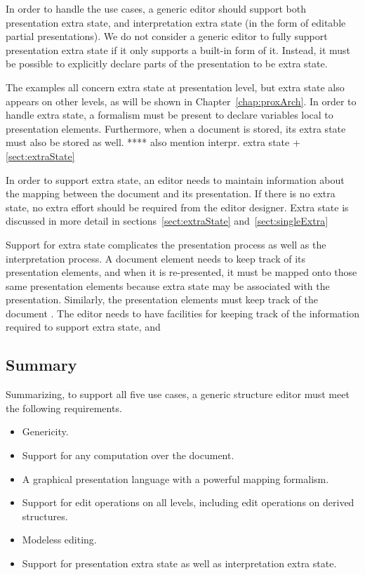 In order to handle the use cases, a generic editor should support both presentation extra state, and interpretation extra state (in the form of editable partial presentations). We do not consider a generic editor to fully support presentation extra state if it only supports a built-in form of it. Instead, it must be possible to explicitly declare parts of the presentation to be extra state.

\bc
The examples all concern extra state at presentation level, but extra state also appears on other levels, as will be shown in Chapter~\ref{chap:proxArch}. In order to handle extra state, a formalism must be present to declare variables local to presentation elements. Furthermore, when a document is stored, its extra state must also be stored as well. **** also mention interpr. extra state + \ref{sect:extraState}
\ec

In order to support extra state, an editor needs to maintain information about the mapping between the document and its presentation. If there is no extra state, no extra effort should be required from the editor designer. Extra state is discussed in more detail in sections~\ref{sect:extraState} and~\ref{sect:singleExtra}

\bc
Support for extra state complicates the presentation process as well as the interpretation process. A document element needs to keep track of its presentation elements, and when it is re-presented, it must be mapped onto those same presentation elements because extra state may be associated with the presentation. Similarly, the presentation elements must keep track of the document . The editor needs to have facilities for keeping track of the information required to support extra state, and
\ec


%																
\subsection{Summary}

Summarizing, to support all five use cases, a generic structure editor must meet the following requirements.

\begin{itemize}
\item Genericity.
\item Support for any computation over the document.
\item A graphical presentation language with a powerful mapping formalism.
\item Support for edit operations on all levels, including edit operations on derived structures.
\item Modeless editing.
\item Support for presentation extra state as well as interpretation extra state.
\end{itemize}


